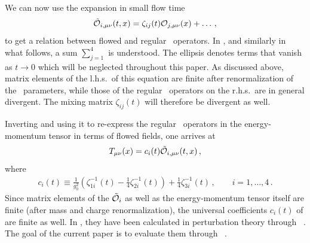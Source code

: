 We can now use the expansion in small flow time\,\cite{Luscher:2011bx}
\begin{equation}
  \begin{split}
    \tilde{\mathcal{O}}_{i,\mu\nu}(t,x) = \zeta_{ij}(t)\mathcal{O}_{j,\mu\nu}(x) + \ldots\,,
    \label{eq:zetas}
  \end{split}
\end{equation}
to get a relation between flowed and regular \qcd\ operators. In
, and similarly in what follows, a sum $\sum_{j=1}^4$ is
understood. The ellipsis denotes terms that vanish as $t\to 0$ which
will be neglected throughout this paper. As discussed above, matrix
elements of the l.h.s.\ of this equation are finite after
renormalization of the \qcd\ parameters, while those of the regular
\qcd\ operators on the r.h.s.\ are in general divergent.  The mixing
matrix $\zeta_{ij}(t)$ will therefore be divergent as well.

Inverting  and using it to re-express the regular
\qcd\ operators in the energy-momentum tensor in terms of flowed fields,
one arrives at
\begin{equation}
  \begin{split}
    T_{\mu\nu}(x) =  c_i (t) \tilde{\mathcal{O}}_{i, \mu \nu} (t, x) \,,
    \label{eq:emtflow}
  \end{split}
\end{equation}
where
\begin{equation}
  \begin{split}
    c_i(t) \equiv \frac{1}{g_{0}^2} \left( \zeta_{1i}^{-1} (t)
		 - \frac{1}{4} \zeta_{2i}^{-1} (t) \right)
		 + \frac{1}{4} \zeta_{3i}^{-1} (t)
                         \,,\qquad i=1,\ldots,4\,.
    \label{eq:EMTGF}
	\end{split}
\end{equation}
Since matrix elements of the $\tilde{\mathcal{O}}_i$ as well as the energy-momentum
tensor itself are finite (after mass and charge renormalization), the
universal coefficients $c_i(t)$ of  are finite as
well.
In , they have been calculated in perturbation
theory through \nlo\ \qcd. The goal of the current paper is to evaluate them
through \nnlo\ \qcd.
